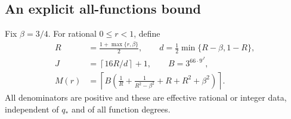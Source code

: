 \documentclass[11pt,a4paper]{article}
\theoremstyle{definition}\newtheorem{definition}[theorem]{Definition}
\theoremstyle{remark}\newtheorem{remark}[theorem]{Remark}
\begin{document}
\subsection{An explicit all-functions bound}
Fix $\beta=3/4$. For rational $0\leq r<1$, define
\begin{equation}\label{eq:bounddata}
\begin{split}
 R&=\frac{1+\max\{r,\beta\}}2,\qquad
 d=\tfrac12\min\{R-\beta,1-R\},\\
 J&=\left\lceil16R/d\right\rceil+1,\qquad B=3^{66\cdot9^J},\\
 M(r)&=\left\lceil B\left(\frac1R+\frac1{R^2-\beta^2}
                         +R+R^2+\beta^2\right)\right\rceil.
\end{split}
\end{equation}
All denominators are positive and these are effective rational or integer
data, independent of $q_*$ and of all function degrees.
\end{document}
